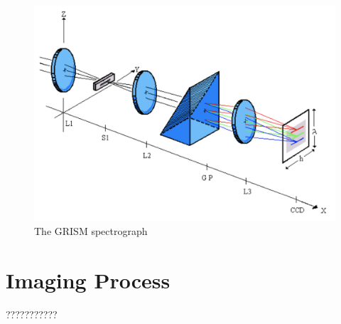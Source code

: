 \begin{figure}[H]
    \centering
    \includegraphics[width = 12cm]{Images/theory/grismspec.png}
    \caption{The GRISM spectrograph}
    \label{fig:sysopt}
\end{figure}

\vspace{1.3cm}
\section{Imaging Process}
???????????

\vspace{1.3cm}
